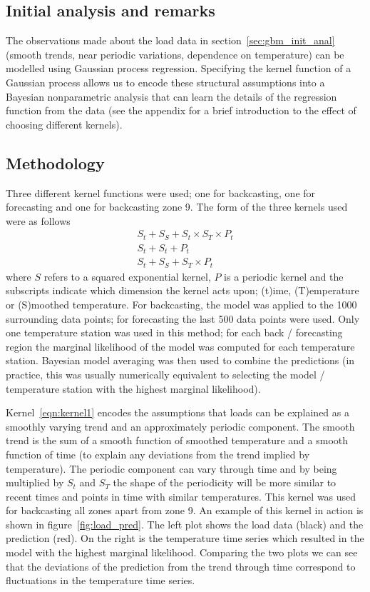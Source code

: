 \documentclass[preprint,authoryear,12pt]{elsarticle}
\begin{document}
\subsection{Initial analysis and remarks}

The observations made about the load data in section~\ref{sec:gbm_init_anal} (\ie smooth trends, near periodic variations, dependence on temperature) can be modelled using Gaussian process regression.
Specifying the kernel function of a Gaussian process allows us to encode these structural assumptions into a Bayesian nonparametric analysis that can learn the details of the regression function from the data (see the appendix for a brief introduction to the effect of choosing different kernels).

\subsection{Methodology}

Three different kernel functions were used; one for backcasting, one for forecasting and one for backcasting zone 9.
The form of the three kernels used were as follows\footnotemark
{}
\begin{eqnarray}
S_t + S_S + S_t \times S_T \times P_t \label{eqn:kernel1}\\
S_t + S_t + P_t \label{eqn:kernel2}\\
S_t + S_S + S_T \times P_t\label{eqn:kernel3}
\end{eqnarray}
where $S$ refers to a squared exponential kernel, $P$ is a periodic kernel and the subscripts indicate which dimension the kernel acts upon; (t)ime, (T)emperature or (S)moothed temperature.
For backcasting, the model was applied to the 1000 surrounding data points; for forecasting the last 500 data points were used.
Only one temperature station was used in this method; for each back / forecasting region the marginal likelihood of the model was computed for each temperature station.
Bayesian model averaging \citep[e.g.][]{Hoeting1999} was then used to combine the predictions (in practice, this was usually numerically equivalent to selecting the model / temperature station with the highest marginal likelihood).

Kernel~\eqref{eqn:kernel1} encodes the assumptions that loads can be explained as a smoothly varying trend and an approximately periodic component.
The smooth trend is the sum of a smooth function of smoothed temperature and a smooth function of time (to explain any deviations from the trend implied by temperature).
The periodic component can vary through time and by being multiplied by $S_t$ and $S_T$ the shape of the periodicity will be more similar to recent times and points in time with similar temperatures.
This kernel was used for backcasting all zones apart from zone 9.
An example of this kernel in action is shown in figure~\ref{fig:load_pred}.
The left plot shows the load data (black) and the prediction (red).
On the right is the temperature time series which resulted in the model with the highest marginal likelihood.
Comparing the two plots we can see that the deviations of the prediction from the trend through time correspond to fluctuations in the temperature time series.
\end{document}
